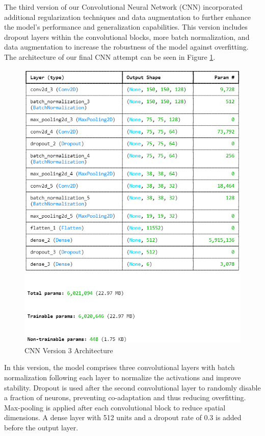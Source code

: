 \documentclass[conference]{IEEEtran}
\begin{document}
The third version of our Convolutional Neural Network (CNN) incorporated additional regularization techniques and data augmentation to further enhance the model's performance and generalization capabilities. This version includes dropout layers within the convolutional blocks, more batch normalization, and data augmentation to increase the robustness of the model against overfitting. The architecture of our final CNN attempt can be seen in Figure \ref{fig:cnnArch3}.

\begin{figure}[H]
    \centering
    \includegraphics[width=1\linewidth]{images/cnn_arch_3.png}
    \caption{CNN Version 3 Architecture}
    \label{fig:cnnArch3}
\end{figure}

In this version, the model comprises three convolutional layers with batch normalization following each layer to normalize the activations and improve stability. Dropout is used after the second convolutional layer to randomly disable a fraction of neurons, preventing co-adaptation and thus reducing overfitting. Max-pooling is applied after each convolutional block to reduce spatial dimensions. A dense layer with 512 units and a dropout rate of 0.3 is added before the output layer.
\end{document}
